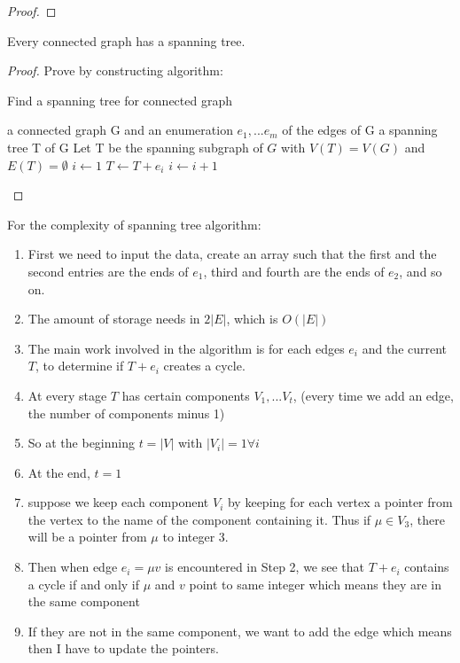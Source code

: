 			\begin{proof}
				
			\end{proof}

			\begin{theorem}
				Every connected graph has a spanning tree.
			\end{theorem}			

			\begin{proof}
				Prove by constructing algorithm:
				\begin{algorithm}[!ht]
					\caption{Find a spanning tree for connected graph}
					\begin{algorithmic}[1]
						\REQUIRE a connected graph G and an enumeration $e_1,...e_m$ of the edges of G
						\ENSURE a spanning tree T of G
						\STATE Let T be the spanning subgraph of $G$ with $V(T)=V(G)$ and $E(T)=\emptyset$
						\STATE $i \gets 1$
								\STATE $T \gets T + e_i$
								\STATE $i \gets i + 1$
							\ENDIF
						\ENDWHILE
					\end{algorithmic}
				\end{algorithm}				
			\end{proof}


			For the complexity of spanning tree algorithm:
			\begin{enumerate}
				\item First we need to input the data, create an array such that the first and the second entries are the ends of $e_1$, third and fourth are the ends of $e_2$, and so on.
				\item The amount of storage needs in $2|E|$, which is $O(|E|)$
				\item The main work involved in the algorithm is for each edges $e_i$ and the current $T$, to determine if $T+e_i$ creates a cycle.
				\item At every stage $T$ has certain components $V_1, ... V_t$, (every time we add an edge, the number of components minus 1)
				\item So at the beginning $t = |V|$ with $|V_i| = 1 \forall i$
				\item At the end, $t = 1$
				\item suppose we keep each component $V_i$ by keeping for each vertex a pointer from the vertex to the name of the component containing it. Thus if $\mu \in V_3$, there will be a pointer from $\mu$ to integer 3.
				\item Then when edge $e_i = \mu v$ is encountered in Step 2, we see that $T+e_i$ contains a cycle if and only if $\mu$ and $v$ point to same integer which means they are in the same component
				\item If they are not in the same component, we want to add the edge which means then I have to update the pointers.
			\end{enumerate}

